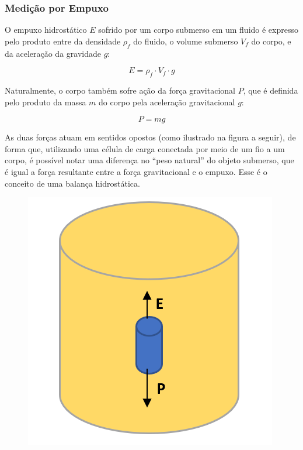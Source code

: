 \subsubsection{Medição por Empuxo}

O empuxo hidrostático \(E\) sofrido por um corpo submerso em um fluido é expresso pelo produto entre da densidade \(\rho_f\) do fluido, o volume submerso \(V_f\) do corpo, e da aceleração da gravidade \(g\): 

\begin{equation}
    E = \rho_f \cdot V_f \cdot g
\end{equation}

Naturalmente, o corpo também sofre ação da força gravitacional \(P\), que é definida pelo produto da massa \(m\) do corpo pela aceleração gravitacional \(g\):

\begin{equation}
    P = mg
\end{equation}

As duas forças atuam em sentidos opostos (como ilustrado na figura a seguir), de forma que, utilizando uma célula de carga conectada por meio de um fio a um corpo, é possível notar uma diferença no “peso natural” do objeto submerso, que é igual a força resultante entre a força gravitacional e o empuxo. Esse é o conceito de uma balança hidrostática.

\begin{figure}[h]
    \centering
    \includegraphics[scale=0.35]{figuras/projeto/hardware/empuxo.PNG}
    \label{fig:empuxo}
\end{figure}


